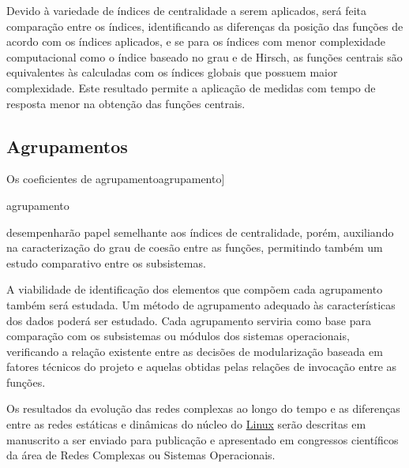 \documentclass[a4paper,12pt,twoside]{article}
\def\linux{\href{http://www.kernel.org/}{\sc Linux}}
\renewcommand\marginpar[1]{}
\let\oldmarginpar\marginpar
\renewcommand\marginpar[1]{\-\oldmarginpar[\raggedleft\footnotesize #1]%
{\raggedright\footnotesize #1}}
\begin{document}
Devido à variedade de índices de centralidade a serem aplicados, será
feita comparação entre os índices, identificando as diferenças da
posição das funções de acordo com os índices aplicados, e se para os
índices com menor complexidade computacional como o índice baseado no
grau e de Hirsch, as funções centrais são equivalentes às calculadas
com os índices globais que possuem maior complexidade. Este resultado
permite a aplicação de medidas com tempo de resposta menor na obtenção
das funções centrais.

\subsection{Agrupamentos}

Os coeficientes de agrupamento\marginpar{agrupamento} desempenharão
papel semelhante aos índices de centralidade, porém, auxiliando na
caracterização do grau de coesão entre as funções, permitindo também
um estudo comparativo entre os subsistemas.

A viabilidade de identificação dos elementos que compõem cada
agrupamento também será estudada. Um método de agrupamento adequado às
características dos dados poderá ser estudado. Cada agrupamento
serviria como base para comparação com os subsistemas ou módulos dos
sistemas operacionais, verificando a relação existente entre as
decisões de modularização baseada em fatores técnicos do projeto e
aquelas obtidas pelas relações de invocação entre as funções.

Os resultados da evolução das redes complexas ao longo do tempo e as
diferenças entre as redes estáticas e dinâmicas do núcleo do \linux{}
serão descritas em manuscrito a ser enviado para publicação e
apresentado em congressos científicos da área de Redes Complexas ou
Sistemas Operacionais.



\end{document}
